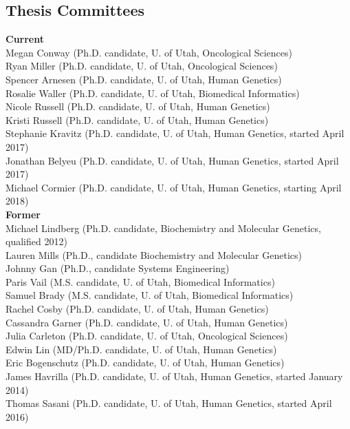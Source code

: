 \documentclass[margin,line]{cv}
\begin{document}
\begin{resume}
    \section{\mysidestyle Thesis Committees}
    
    \textbf{Current}\\
    Megan Conway (Ph.D. candidate, U. of Utah, Oncological Sciences)\\
    Ryan Miller (Ph.D. candidate, U. of Utah, Oncological Sciences)\\
    Spencer Arnesen (Ph.D. candidate, U. of Utah, Human Genetics)\\
    Rosalie Waller (Ph.D. candidate, U. of Utah, Biomedical Informatics)\\
    Nicole Russell (Ph.D. candidate, U. of Utah, Human Genetics)\\
    Kristi Russell (Ph.D. candidate, U. of Utah, Human Genetics)\\
    Stephanie Kravitz (Ph.D. candidate, U. of Utah, Human Genetics, started April 2017) \\
    Jonathan Belyeu (Ph.D. candidate, U. of Utah, Human Genetics, started April 2017) \\
    Michael Cormier (Ph.D. candidate, U. of Utah, Human Genetics, starting April 2018) \\


    \textbf{Former} \\
    Michael Lindberg (Ph.D. candidate, Biochemistry and Molecular Genetics, qualified 2012)\\
    Lauren Mills (Ph.D., candidate Biochemistry and Molecular Genetics)\\
	Johnny Gan (Ph.D., candidate Systems Engineering) \\
    Paris Vail (M.S. candidate, U. of Utah, Biomedical Informatics) \\
    Samuel Brady (M.S. candidate, U. of Utah, Biomedical Informatics)\\
    Rachel Cosby (Ph.D. candidate, U. of Utah, Human Genetics)\\
    Cassandra Garner (Ph.D. candidate, U. of Utah, Human Genetics)\\
    Julia Carleton (Ph.D. candidate, U. of Utah, Oncological Sciences)\\
    Edwin Lin (MD/Ph.D. candidate, U. of Utah, Human Genetics)\\
    Eric Bogenschutz (Ph.D. candidate, U. of Utah, Human Genetics)\\
    James Havrilla (Ph.D. candidate, U. of Utah, Human Genetics, started January 2014) \\
    Thomas Sasani (Ph.D. candidate, U. of Utah, Human Genetics, started April 2016) \\




\end{resume}
\end{document}
